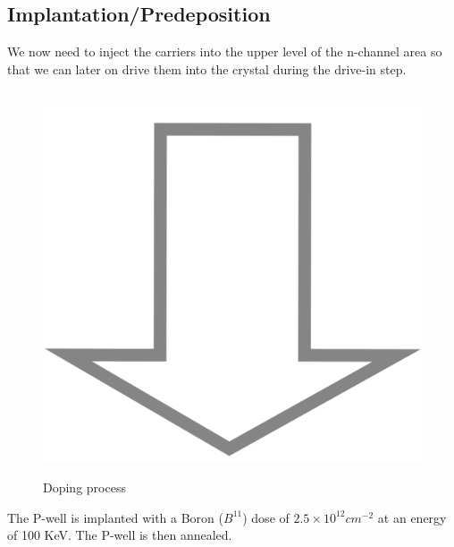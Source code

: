 \newpage

\subsection{Implantation/Predeposition}\label{pwell_implant_step}
We now need to inject the carriers into the upper level of the n-channel area so that we can later on drive them into the crystal during the drive-in step.
\begin{figure}[H]
	\centering
	\begin{tikzpicture}[node distance = 3cm, auto, thick,scale=\CrossSectionOnly, every node/.style={transform shape}]
		
	\end{tikzpicture} \\
	\includegraphics[scale=0.01]{down_arrow.png} \\
	\begin{tikzpicture}[node distance = 3cm, auto, thick,scale=\CrossSectionOnly, every node/.style={transform shape}]
		
	\end{tikzpicture}
	\caption{Doping process}
\end{figure}
The P-well is implanted with a Boron ($B^{11}$) dose of $2.5\times10^{12}cm^{-2}$ at an energy of 100 KeV.
The P-well is then annealed.

